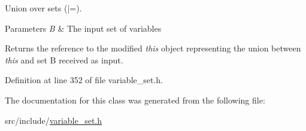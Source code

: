 Union over sets ($\vert$=). 


\begin{DoxyParams}{Parameters}
{\em B} & The input set of variables \\
\hline
\end{DoxyParams}
\begin{DoxyReturn}{Returns}
the reference to the modified {\itshape this} object representing the union between {\itshape this} and set B received as input. 
\end{DoxyReturn}


Definition at line 352 of file variable\+\_\+set.\+h.



The documentation for this class was generated from the following file\+:\begin{DoxyCompactItemize}
\item 
src/include/\hyperlink{variable__set_8h}{variable\+\_\+set.\+h}\end{DoxyCompactItemize}
